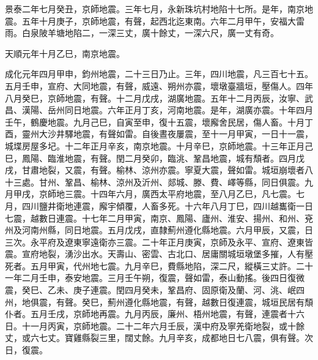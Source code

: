 \begin{pinyinscope}
景泰二年七月癸丑，京師地震。三年七月，永新珠坑村地陷十七所。是年，南京地震。五年十月庚子，京師地震，有聲，起西北迄東南。六年二月甲午，安福大雷雨。白泉陂羊塘地陷二，一深三丈，廣十餘丈，一深六尺，廣一丈有奇。

天順元年十月乙巳，南京地震。

成化元年四月甲申，鈞州地震，二十三日乃止。三年，四川地震，凡三百七十五。五月壬申，宣府、大同地震，有聲，威遠、朔州亦震，壞墩臺牆垣，壓傷人。四年八月癸巳，京師地震，有聲。十二月戊戌，湖廣地震。五年十二月丙辰，汝寧、武昌、漢陽、岳州同日地震。六年正月丁亥，河南地震。是年，湖廣亦震。十年四月壬午，鶴慶地震。九月己巳，自寅至申，復十五震，壞廨舍民居，傷人畜。十月丁酉，靈州大沙井驛地震，有聲如雷。自後晝夜屢震，至十一月甲寅，一日十一震，城堞房屋多圮。十二年正月辛亥，南京地震。十月辛巳，京師地震。十三年正月己巳，鳳陽、臨淮地震，有聲。閏二月癸卯，臨洮、鞏昌地震，城有頹者。四月戊戌，甘肅地裂，又震，有聲。榆林、涼州亦震。寧夏大震，聲如雷。城垣崩壞者八十三處。甘州、鞏昌、榆林、涼州及沂州、郯城、滕、費、嶧等縣，同日俱震。九月甲戌，京師地三震。十四年六月，廣西太平府地震，至八月乙巳，凡七震。七月，四川鹽井衛地連震，廨宇傾覆，人畜多死。十六年八月丁巳，四川越巂衛一日七震，越數日連震。十七年二月甲寅，南京、鳳陽、廬州、淮安、揚州、和州、兗州及河南州縣，同日地震。五月戊戌，直隸薊州遵化縣地震。六月甲辰，又震，日三次。永平府及遼東寧遠衛亦三震。二十年正月庚寅，京師及永平、宣府、遼東皆震。宣府地裂，湧沙出水。天壽山、密雲、古北口、居庸關城垣墩堡多摧，人有壓死者。五月甲寅，代州地七震。九月辛巳，費縣地陷，深二尺，縱橫三丈許。二十一年二月壬申，泰安地震。三月壬午朔，復震，聲如雷，泰山動搖。後四日復微震，癸巳、乙未、庚子連震。閏四月癸未，鞏昌府、固原衛及蘭、河、洮、岷四州，地俱震，有聲。癸巳，薊州遵化縣地震，有聲，越數日復連震，城垣民居有頹仆者。五月壬戌，京師地再震。九月丙辰，廉州、梧州地震，有聲，連震者十六日。十一月丙寅，京師地震。二十二年六月壬辰，漢中府及寧羌衛地裂，或十餘丈，或六七丈。寶雞縣裂三里，闊丈餘。九月辛亥，成都地日七八震，俱有聲。次日，復震。


\end{pinyinscope}
